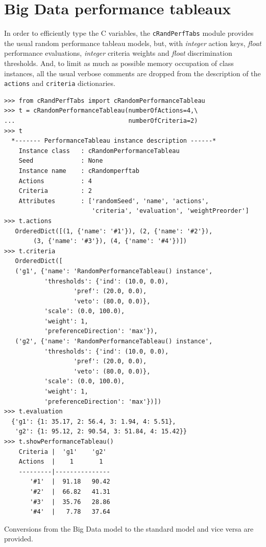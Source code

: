 \section{Big Data performance tableaux}
\label{sec:11.2}

In order to efficiently type the C variables, the \texttt{cRandPerfTabs} module provides the usual random performance tableau models, but, with \emph{integer} action keys, \emph{float} performance evaluations, \emph{integer} criteria weights and \emph{float} discrimination thresholds. And, to limit as much as possible memory occupation of class instances, all the usual verbose comments are dropped from the description of the \texttt{actions} and \texttt{criteria} dictionaries. 

\begin{lstlisting}[caption={Big data performance tableau format},label=list:11.1]
>>> from cRandPerfTabs import cRandomPerformanceTableau
>>> t = cRandomPerformanceTableau(numberOfActions=4,\
...                               numberOfCriteria=2)
>>> t
  *------- PerformanceTableau instance description ------*
    Instance class   : cRandomPerformanceTableau
    Seed             : None
    Instance name    : cRandomperftab
    Actions          : 4
    Criteria         : 2
    Attributes       : ['randomSeed', 'name', 'actions',
                        'criteria', 'evaluation', 'weightPreorder']
>>> t.actions
   OrderedDict([(1, {'name': '#1'}), (2, {'name': '#2'}),
		(3, {'name': '#3'}), (4, {'name': '#4'})])
>>> t.criteria
   OrderedDict([
   ('g1', {'name': 'RandomPerformanceTableau() instance',
	       'thresholds': {'ind': (10.0, 0.0),
			       'pref': (20.0, 0.0),
			       'veto': (80.0, 0.0)},
	       'scale': (0.0, 100.0),
	       'weight': 1,
	       'preferenceDirection': 'max'}),
   ('g2', {'name': 'RandomPerformanceTableau() instance',
	       'thresholds': {'ind': (10.0, 0.0),
			       'pref': (20.0, 0.0),
			       'veto': (80.0, 0.0)},
	       'scale': (0.0, 100.0),
	       'weight': 1,
	       'preferenceDirection': 'max'})])
>>> t.evaluation
  {'g1': {1: 35.17, 2: 56.4, 3: 1.94, 4: 5.51},
   'g2': {1: 95.12, 2: 90.54, 3: 51.84, 4: 15.42}}
>>> t.showPerformanceTableau()
	Criteria |  'g1'    'g2'   
	Actions  |    1       1    
	---------|---------------
	   '#1'  |  91.18   90.42  
	   '#2'  |  66.82   41.31  
	   '#3'  |  35.76   28.86  
	   '#4'  |   7.78   37.64  
\end{lstlisting}

Conversions from the Big Data model to the standard model and vice versa are provided.

